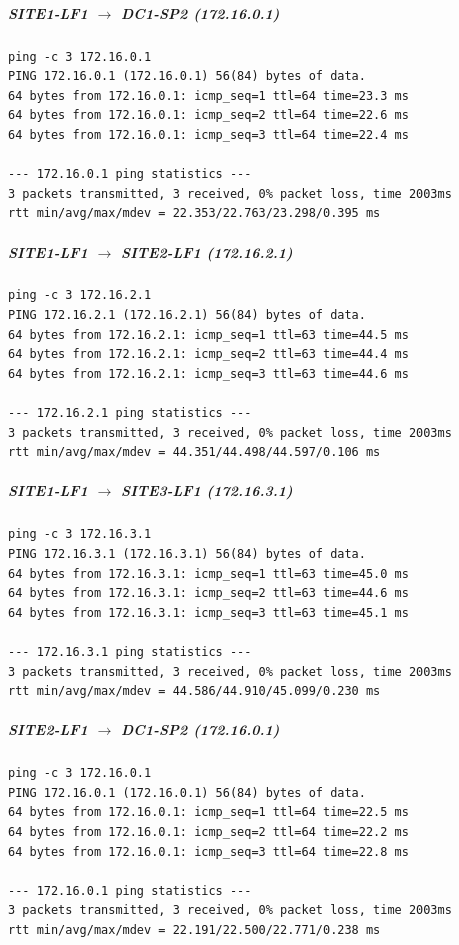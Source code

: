 \documentclass[11pt]{article}
\begin{document}
\subparagraph{SITE1-LF1 $\rightarrow$ DC1-SP2 (172.16.0.1)}

\begin{verbatim}
ping -c 3 172.16.0.1
PING 172.16.0.1 (172.16.0.1) 56(84) bytes of data.
64 bytes from 172.16.0.1: icmp_seq=1 ttl=64 time=23.3 ms
64 bytes from 172.16.0.1: icmp_seq=2 ttl=64 time=22.6 ms
64 bytes from 172.16.0.1: icmp_seq=3 ttl=64 time=22.4 ms

--- 172.16.0.1 ping statistics ---
3 packets transmitted, 3 received, 0% packet loss, time 2003ms
rtt min/avg/max/mdev = 22.353/22.763/23.298/0.395 ms
\end{verbatim}

\subparagraph{SITE1-LF1 $\rightarrow$ SITE2-LF1 (172.16.2.1)}

\begin{verbatim}
ping -c 3 172.16.2.1
PING 172.16.2.1 (172.16.2.1) 56(84) bytes of data.
64 bytes from 172.16.2.1: icmp_seq=1 ttl=63 time=44.5 ms
64 bytes from 172.16.2.1: icmp_seq=2 ttl=63 time=44.4 ms
64 bytes from 172.16.2.1: icmp_seq=3 ttl=63 time=44.6 ms

--- 172.16.2.1 ping statistics ---
3 packets transmitted, 3 received, 0% packet loss, time 2003ms
rtt min/avg/max/mdev = 44.351/44.498/44.597/0.106 ms
\end{verbatim}

\subparagraph{SITE1-LF1 $\rightarrow$ SITE3-LF1 (172.16.3.1)}

\begin{verbatim}
ping -c 3 172.16.3.1
PING 172.16.3.1 (172.16.3.1) 56(84) bytes of data.
64 bytes from 172.16.3.1: icmp_seq=1 ttl=63 time=45.0 ms
64 bytes from 172.16.3.1: icmp_seq=2 ttl=63 time=44.6 ms
64 bytes from 172.16.3.1: icmp_seq=3 ttl=63 time=45.1 ms

--- 172.16.3.1 ping statistics ---
3 packets transmitted, 3 received, 0% packet loss, time 2003ms
rtt min/avg/max/mdev = 44.586/44.910/45.099/0.230 ms
\end{verbatim}

\subparagraph{SITE2-LF1 $\rightarrow$ DC1-SP2 (172.16.0.1)}

\begin{verbatim}
ping -c 3 172.16.0.1
PING 172.16.0.1 (172.16.0.1) 56(84) bytes of data.
64 bytes from 172.16.0.1: icmp_seq=1 ttl=64 time=22.5 ms
64 bytes from 172.16.0.1: icmp_seq=2 ttl=64 time=22.2 ms
64 bytes from 172.16.0.1: icmp_seq=3 ttl=64 time=22.8 ms

--- 172.16.0.1 ping statistics ---
3 packets transmitted, 3 received, 0% packet loss, time 2003ms
rtt min/avg/max/mdev = 22.191/22.500/22.771/0.238 ms
\end{verbatim}
\end{document}
